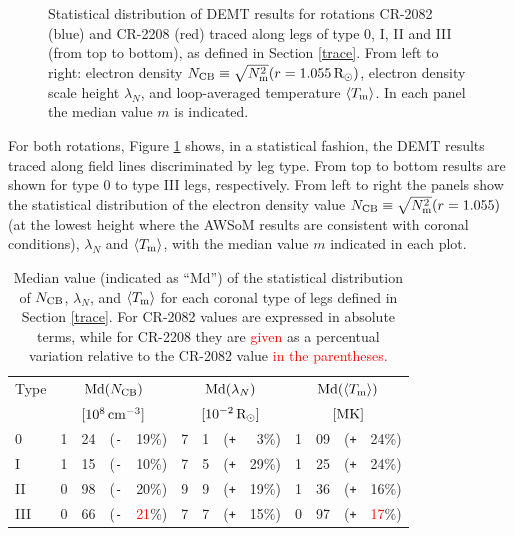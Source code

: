 \documentclass[namedreferences]{solarphysics}
\def\edit#1{\textcolor{Red}{#1}}
\newcommand{\mrsun}{{\rm R_\odot}}
\newcommand{\med}{{\rm Md}}
\newcommand{\avgTe}{\left<\Tm\right>}
\newcommand{\MK}{{\rm MK}}
\newcommand{\lN}{\lambda_N}
\newcommand{\NCB}{N_{\rm CB}}
\newcommand{\Tm}{T_{\rm m}}
\newcommand{\aTm}{\left<\Tm\right>}
\newcommand{\Nsqm}{N^2_{{\rm m}}}
\newcommand{\sqravgN}{\sqrt{\Nsqm}}
\newcommand{\Pl}{\texttt{+}}
\newcommand{\Mi}{\texttt{-}}
\begin{document}
\begin{article}
\begin{figure}[h!]
\begin{center}
\caption{{Statistical distribution of {DEMT results for rotations CR-2082 (blue) and CR-2208 (red)} traced along legs of type 0, I, II and III (from top to bottom), as defined in Section \ref{trace}. From left to right: {electron density $\NCB\equiv\sqravgN(r=1.055\,\mrsun)$,} electron density scale height $\lN$, {and loop-averaged temperature $\aTm$. In each panel} the median value $m$ is indicated.} }
\label{histos_fulldemt}
\end{center}
\end{figure} 

{For both rotations, Figure \ref{histos_fulldemt} shows, in a statistical fashion, the DEMT results traced along field lines discriminated by leg type}. From top to bottom {results are shown for} type 0 to type III {legs}{, respectively}. From left to right the panels show the statistical distribution of the electron density value $\NCB \equiv \sqravgN(r=1.055)$ {(at the lowest height where the AWSoM results are consistent with coronal conditions)}, $\lN$ {and} $\aTm$, {with the median value $m$ indicated in each plot}.

\begin{table}[h!]
\begin{tabular}{l r@{.}l@{\hskip 0.05in} r@{\hskip 0.01in} r  r@{.}l@{\hskip 0.05in} r@{\hskip 0.01in} r r@{.}l@{\hskip 0.05in} r@{\hskip 0.01in} r }
\hline
Type    & \multicolumn{4}{c}{$\med(\NCB)$}             & \multicolumn{4}{c}{$\med(\lN)$} & \multicolumn{4}{c}{$\med(\avgTe)$} \\
        & \multicolumn{4}{c}{$[10^8\,{\rm cm}^{-3}]$}  & \multicolumn{4}{c}{$[{\rm 10}^{-2}\,\mrsun]$} & \multicolumn{4}{c}{$[\MK]$} \\
\hline
0    & 1&24 &(\Mi&19\%)  &   7&1 &(\Pl&~3\%) &   1&09 &(\Pl&24\%) \\
I    & 1&15 &(\Mi&10\%)  &   7&5 &(\Pl&29\%) &   1&25 &(\Pl&24\%) \\
II   & 0&98 &(\Mi&20\%)  &   9&9 &(\Pl&19\%) &   1&36 &(\Pl&16\%) \\
III  & 0&66 &(\Mi&\edit{21}\%)  &   7&7 &(\Pl&15\%) &   0&97 &(\Pl&\edit{17}\%) \\
\hline          
\end{tabular}
\caption{Median value (indicated as ``Md'') of the statistical distribution of $\NCB$, $\lN$, and $\aTm$ for each coronal type of legs defined in Section \ref{trace}. For CR-2082 values are expressed in absolute terms, while for CR-2208 they are \edit{given} as a percentual variation relative to the CR-2082 value \edit{in the parentheses.}}
\label{tabla_demt}
\end{table}


\end{article}
\end{document}
